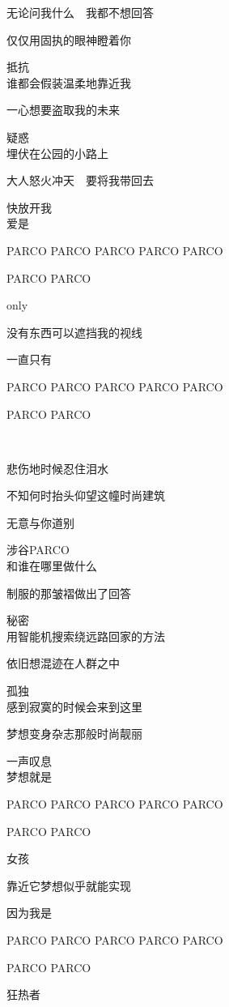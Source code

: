 无论问我什么　我都不想回答

仅仅用固执的眼神瞪着你

抵抗
\\

谁都会假装温柔地靠近我

一心想要盗取我的未来

疑惑
\\

埋伏在公园的小路上

大人怒火冲天　要将我带回去

快放开我
\\

爱是

PARCO PARCO PARCO PARCO PARCO

PARCO PARCO

only

没有东西可以遮挡我的视线

一直只有

PARCO PARCO PARCO PARCO PARCO

PARCO PARCO


悲伤地时候忍住泪水

不知何时抬头仰望这幢时尚建筑

无意与你道别

涉谷PARCO
\\

和谁在哪里做什么

制服的那皱褶做出了回答

秘密
\\

用智能机搜索绕远路回家的方法

依旧想混迹在人群之中

孤独
\\

感到寂寞的时候会来到这里

梦想变身杂志那般时尚靓丽

一声叹息
\\

梦想就是

PARCO PARCO PARCO PARCO PARCO

PARCO PARCO

女孩

靠近它梦想似乎就能实现

因为我是

PARCO PARCO PARCO PARCO PARCO

PARCO PARCO

狂热者

